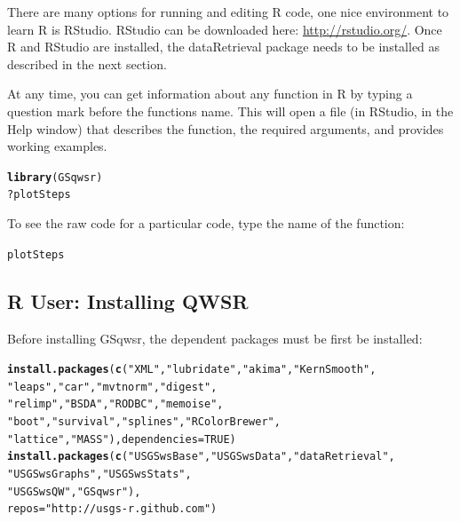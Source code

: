 \documentclass[a4paper,11pt]{article}\usepackage[]{graphicx}\usepackage[]{color}
\makeatletter
\newcommand{\hlstr}[1]{\textcolor[rgb]{0.192,0.494,0.8}{#1}}%
\newcommand{\hlkwd}[1]{\textcolor[rgb]{0.737,0.353,0.396}{\textbf{#1}}}%
\newenvironment{kframe}{%
 \def\at@end@of@kframe{}%
 \ifinner\ifhmode%
  \def\at@end@of@kframe{\end{minipage}}%
  \begin{minipage}{\columnwidth}%
 \fi\fi%
 \def\FrameCommand##1{\hskip\@totalleftmargin \hskip-\fboxsep
 \colorbox{shadecolor}{##1}\hskip-\fboxsep
     \hskip-\linewidth \hskip-\@totalleftmargin \hskip\columnwidth}%
 \MakeFramed {\advance\hsize-\width
   \@totalleftmargin\z@ \linewidth\hsize
   \@setminipage}}%
 {\par\unskip\endMakeFramed%
 \at@end@of@kframe}
\newenvironment{knitrout}{}{} %
\makeatother
\begin{document}
There are many options for running and editing R code, one nice environment to learn R is RStudio. RStudio can be downloaded here: \url{http://rstudio.org/}. Once R and RStudio are installed, the dataRetrieval package needs to be installed as described in the next section.

At any time, you can get information about any function in R by typing a question mark before the functions name.  This will open a file (in RStudio, in the Help window) that describes the function, the required arguments, and provides working examples.

\begin{knitrout}
\color{fgcolor}\begin{kframe}
\begin{alltt}
\hlkwd{library}(GSqwsr)
?plotSteps
\end{alltt}
\end{kframe}
\end{knitrout}


To see the raw code for a particular code, type the name of the function:
\begin{knitrout}
\color{fgcolor}\begin{kframe}
\begin{alltt}
plotSteps
\end{alltt}
\end{kframe}
\end{knitrout}


\subsection{R User: Installing QWSR}
Before installing GSqwsr, the dependent packages must be first be installed:

\begin{knitrout}
\color{fgcolor}\begin{kframe}
\begin{alltt}
\hlkwd{install.packages}(\hlkwd{c}(\hlstr{"XML"}, \hlstr{"lubridate"}, \hlstr{"akima"}, \hlstr{"KernSmooth"},
                   \hlstr{"leaps"}, \hlstr{"car"}, \hlstr{"mvtnorm"}, \hlstr{"digest"},
                   \hlstr{"relimp"}, \hlstr{"BSDA"}, \hlstr{"RODBC"},\hlstr{"memoise"},
                   \hlstr{"boot"},\hlstr{"survival"},\hlstr{"splines"},\hlstr{"RColorBrewer"},
                   \hlstr{"lattice"},\hlstr{"MASS"}), dependencies=TRUE)
\hlkwd{install.packages}(\hlkwd{c}(\hlstr{"USGSwsBase"},\hlstr{"USGSwsData"},\hlstr{"dataRetrieval"},
                   \hlstr{"USGSwsGraphs"},\hlstr{"USGSwsStats"},
                   \hlstr{"USGSwsQW"},\hlstr{"GSqwsr"}), 
                 repos=\hlstr{"http://usgs-r.github.com"})
\end{alltt}
\end{kframe}
\end{knitrout}
\end{document}

